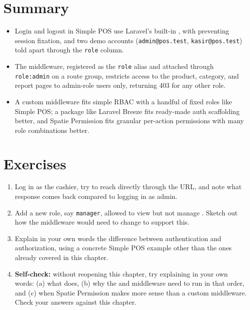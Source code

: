 
\section{Summary}
\label{sec:autentikasi-dan-otorisasi-rangkuman}

\begin{itemize}
  \item Login and logout in Simple POS use Laravel's built-in
    , with 
    preventing session fixation, and two demo accounts
    (\texttt{admin@pos.test}, \texttt{kasir@pos.test}) told apart
    through the \texttt{role} column.
  \item The  middleware, registered as the
    \texttt{role} alias and attached through \texttt{role:admin} on a
    route group, restricts access to the product, category, and report
    pages to admin-role users only, returning 403 for any other role.
  \item A custom middleware fits simple RBAC with a handful of fixed
    roles like Simple POS; a package like Laravel Breeze fits
    ready-made auth scaffolding better, and Spatie Permission fits
    granular per-action permissions with many role combinations better.
\end{itemize}

\section{Exercises}

\begin{enumerate}
  \item Log in as the cashier, try to reach  directly
    through the URL, and note what response comes back compared to
    logging in as admin.
  \item Add a new role, say \texttt{manager}, allowed to view
     but not manage . Sketch out how
    the middleware would need to change to support this.
  \item Explain in your own words the difference between authentication
    and authorization, using a concrete Simple POS example other than
    the ones already covered in this chapter.
  \item \textbf{Self-check:} without reopening this chapter, try
    explaining in your own words: (a) what 
    does, (b) why the  and 
    middleware need to run in that order, and (c) when Spatie
    Permission makes more sense than a custom middleware. Check your
    answers against this chapter.
\end{enumerate}

